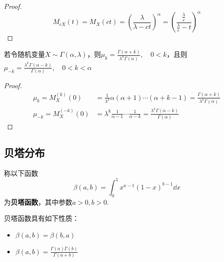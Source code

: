 \begin{proof}
    \[ M_{c X}(t) = M_X(c t) =(\frac{\lambda}{\lambda-c t})^{\alpha}=(\frac{\frac{\lambda}{c}}{\frac{\lambda}{c}-t})^{\alpha}\]
\end{proof}

\begin{proposition}
    若令随机变量$X \sim \Gamma(\alpha,\lambda)$，则$\mu_k=\frac{\Gamma(\alpha+k)}{\lambda^{k}\Gamma(\alpha)}, \quad 0<k$，且则$\mu_{-k}=\frac{\lambda^{k}\Gamma(\alpha-k)}{\Gamma(\alpha)}, \quad 0<k<\alpha$
\end{proposition}

\begin{proof}
    \begin{align*}
        \mu_k=M_X^{(k)}(0)     & =\frac{1}{\lambda^{k}}\alpha(\alpha+1)\cdots(\alpha+k-1) =\frac{\Gamma(\alpha+k)}{\lambda^{k}\Gamma(\alpha)} \\
        \mu_{-k}=M_X^{(-k)}(0) & =\lambda^{k}\frac{1}{\alpha-1}\cdots\frac{1}{\alpha-k} =\frac{\lambda^{k}\Gamma(\alpha-k)}{\Gamma(\alpha)}
    \end{align*}
\end{proof}



\begin{proposition}
\end{proposition}

\subsection{贝塔分布}

\begin{definition}
    称以下函数
    \[ \beta(a,b) = \int_0^1 x^{a-1}(1-x)^{b-1}\dd x \]
    为\textbf{贝塔函数}，其中参数$a>0,b>0$.
\end{definition}

\begin{proposition}
    贝塔函数具有如下性质：
    \begin{itemize}
        \item $\beta(a,b)=\beta(b,a)$
        \item $\beta(a,b) = \frac{\Gamma(a)\Gamma(b)}{\Gamma(a+b)}$
    \end{itemize}
\end{proposition}

